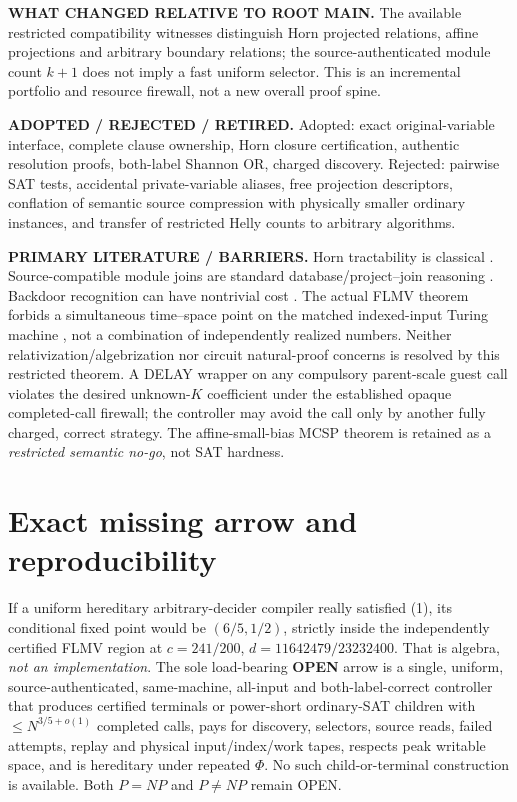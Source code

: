 \documentclass[11pt]{article}
\begin{document}
\noindent\textbf{WHAT CHANGED RELATIVE TO ROOT MAIN.}
The available restricted compatibility witnesses distinguish Horn
projected relations, affine projections and arbitrary boundary relations;
the source-authenticated module count $k+1$ does not imply a fast
uniform selector. This is an incremental portfolio and resource
firewall, not a new overall proof spine.

\noindent\textbf{ADOPTED / REJECTED / RETIRED.}
Adopted: exact original-variable interface, complete clause ownership,
Horn closure certification, authentic resolution proofs, both-label
Shannon OR, charged discovery. Rejected: pairwise SAT tests, accidental
private-variable aliases, free projection descriptors, conflation
of semantic source compression with physically smaller ordinary
instances, and transfer of restricted Helly counts to arbitrary
algorithms.

\noindent\textbf{PRIMARY LITERATURE / BARRIERS.}
Horn tractability is classical \cite{DG,Schaefer}. Source-compatible
module joins are standard database/project--join reasoning
\cite{Yannakakis}. Backdoor recognition can have nontrivial cost
\cite{DOS}. The actual FLMV theorem forbids a simultaneous time--space
point on the matched indexed-input Turing machine \cite{FLMV},
not a combination of independently realized numbers. Neither
relativization/algebrization nor circuit natural-proof concerns is
resolved by this restricted theorem. A DELAY wrapper on any
compulsory parent-scale guest call violates the desired unknown-$K$
coefficient under the established opaque completed-call firewall;
the controller may avoid the call only by another fully charged,
correct strategy. The affine-small-bias MCSP theorem is retained
as a \emph{restricted semantic no-go}, not SAT hardness.

\section{Exact missing arrow and reproducibility}
If a uniform hereditary arbitrary-decider compiler really satisfied
(1), its conditional fixed point would be $(6/5,1/2)$, strictly
inside the independently certified FLMV region at
$c=241/200$, $d=11642479/23232400$.
That is algebra, \emph{not an implementation}. The sole load-bearing
\textbf{OPEN} arrow is a single, uniform, source-authenticated,
same-machine, all-input and both-label-correct controller that
produces certified terminals or power-short ordinary-SAT children
with $\le N^{3/5+o(1)}$ completed calls, pays for discovery,
selectors, source reads, failed attempts, replay and physical
input/index/work tapes, respects peak writable space, and is
hereditary under repeated $\Phi$. No such child-or-terminal
construction is available. Both $P=NP$ and $P\ne NP$ remain OPEN.
\end{document}
